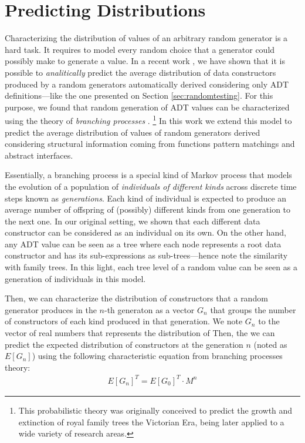 \section{Predicting Distributions} \label{sec:synthesis}

Characterizing the distribution of values of an arbitrary random generator is a
hard task.
%
It requires to model every random choice that a generator could possibly make to
generate a value.
%
In a recent work \cite{DBLP:conf/haskell/MistaRH18}, we have shown that it is
possible to \emph{analitically} predict the average distribution of data
constructors produced by a random generators automatically derived considering
only ADT definitions---like the one presented on Section
\ref{sec:randomtesting}.
%
For this purpose, we found that random generation of ADT values can be
characterized using the theory of \emph{branching processes} \cite{gw1875}.
%
\footnote{
%
This probabilistic theory was originally conceived to predict the growth and
extinction of royal family trees the Victorian Era, being later applied to a
wide variety of research areas.}
%
In this work we extend this model to predict the average distribution of values
of random generators derived considering structural information coming from
functions pattern matchings and abstract interfaces.


Essentially, a branching process is a special kind of Markov process that models
the evolution of a population of \emph{individuals of different kinds} across
discrete time steps known as \emph{generations}.
%
Each kind of individual is expected to produce an average number of offspring of
(possibly) different kinds from one generation to the next one.
%
In our original setting, we shown that each different data constructor can be
considered as an individual on its own.
%
On the other hand, any ADT value can be seen as a tree where each node
represents a root data constructor and has its sub-expressions as
sub-trees---hence note the similarity with family trees.
%
In this light, each tree level of a random value can be seen as a generation of
individuals in this model.


Then, we can characterize the distribution of constructors that a random
generator produces in the $n$-th generaton as a vector $G_n$ that groups the
number of constructors of each kind produced in that generation.
We note $G_n$ to the vector of real numbers that represents the distribution of
%
Then, the we can predict the expected distribution of constructors at the
generation $n$ (noted as $E[G_n]$) using the following characteristic equation
from branching processes theory:
%
\begin{align}
  E[G_n]^T = E[G_0]^T \cdot M^n
  \label{eqn:prediction}
\end{align}

